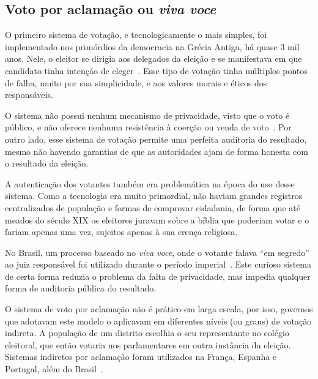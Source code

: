 \subsection{Voto por aclamação ou \textit{viva voce}}

O primeiro sistema de votação, e tecnologicamente o mais simples, foi
implementado nos primórdios da democracia na Grécia Antiga, há quase 3 mil
anos. Nele, o eleitor se dirigia aos delegados da eleição e se manifestava em
que candidato tinha intenção de eleger~\cite{wolfson1899ballot}. Esse tipo de
votação tinha múltiplos pontos de falha, muito por sua simplicidade, e aos
valores morais e éticos dos responsáveis.

O sistema não possui nenhum mecanismo de privacidade, visto que o voto é
público, e não oferece nenhuma resistência à coerção ou venda de
voto~\cite{buchstein2010public}. Por outro lado, esse sistema de votação
permite uma perfeita auditoria do resultado, mesmo não havendo garantias de que
as autoridades ajam de forma honesta com o resultado da eleição.

A autenticação dos votantes também era problemática na época do uso desse
sistema. Como a tecnologia era muito primordial, não haviam grandes registros
centralizados de população e formas de comprovar cidadania, de forma que até
meados do século XIX os eleitores juravam sobre a bíblia que poderiam votar e o
fariam apenas uma vez, sujeitos apenas à sua crença religiosa.

No Brasil, um processo baseado no \textit{viva voce}, onde o votante falava
``em segredo'' ao juiz responsável foi utilizado durante o período
imperial~\cite{nicolau2012eleicoes}. Este curioso sistema de certa forma
reduzia o problema da falta de privacidade, mas impedia qualquer forma de
auditoria pública do resultado.

O sistema de voto por aclamação não é prático em larga escala, por isso,
governos que adotavam este modelo o aplicavam em diferentes níveis (ou graus)
de votação indireta. A população de um distrito escolhia o seu representante no
colégio eleitoral, que então votaria nos parlamentares em outra instância da
eleição. Sistemas indiretos por aclamação foram utilizados na França, Espanha e
Portugal, além do Brasil~\cite{nicolau2012eleicoes}.
